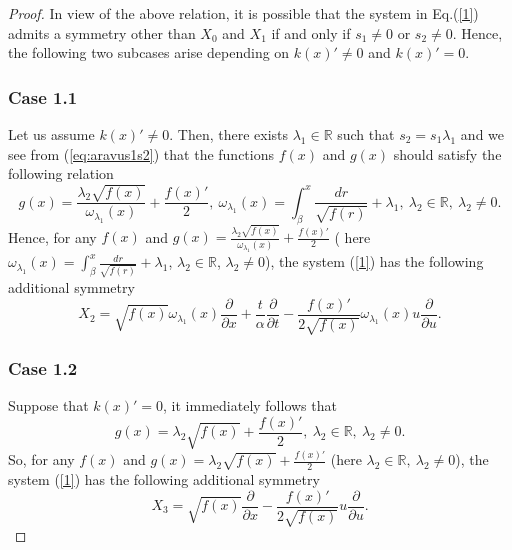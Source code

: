\documentclass[12pt]{amsart}
\begin{document}
\begin{proof}
In view of the above relation, it is possible that the system in Eq.(\ref{1}) admits a symmetry other than $X_0$ and $X_1$ if and only if $s_1\neq 0$ or $s_2\neq 0$. Hence, the following two subcases arise depending on $k(x)'\neq 0$ and $k(x)'=0$.

\subsubsection*{Case 1.1}
Let us assume $k(x)'\neq 0.$ Then, there exists $\lambda_1\in\mathbb{R}$ such that $s_2=s_1\lambda_1$ and we see from (\ref{eq:aravus1s2}) that the functions $f(x)$ and $g(x)$ should satisfy the following relation 
$$g(x)=\frac{\lambda_2 \sqrt{f(x)}}{\omega_{\lambda_1}(x)}+\frac{f(x)'}{2},~\omega_{\lambda_1}(x)=\int_\beta^x \frac{dr}{\sqrt{f(r)}} +\lambda_1,~\lambda_2\in \mathbb{R},~ \lambda_2\ne 0.$$ 
Hence, for any $f(x)$ and $g(x)=\frac{\lambda_2 \sqrt{f(x)}}{\omega_{\lambda_1}(x)}+\frac{f(x)'}{2}$ ( here $\omega_{\lambda_1}(x)=\int_\beta^x \frac{dr}{\sqrt{f(r)}} +\lambda_1$, $\lambda_2\in \mathbb{R}$, $\lambda_2\ne 0$),  the system (\ref{1}) has the following additional symmetry
\begin{equation*}
X_2 = \sqrt{f(x)}\omega_{\lambda_1}(x)\frac{\partial}{\partial x}
+\frac{t}{\alpha}\frac{\partial}{\partial t}-\frac{f(x)'}{2\sqrt{f(x)}}\omega_{\lambda_1}(x)u \frac{\partial}{\partial u}.
\end{equation*}

\subsubsection*{Case 1.2}
Suppose that $k(x)'=0$, it immediately follows that
$$g(x)=\lambda_2 \sqrt{f(x)}+\frac{f(x)'}{2}, ~\lambda_2\in \mathbb{R},~ \lambda_2\ne 0.$$
So, for any $f(x)$ and $g(x)=\lambda_2 \sqrt{f(x)}+\frac{f(x)'}{2}$ (here $\lambda_2\in \mathbb{R},~ \lambda_2\ne 0$), the system (\ref{1}) has the following additional symmetry
\begin{equation*}
X_3=\sqrt{f(x)}\frac{\partial}{\partial x}-\frac{f(x)'}{2\sqrt{f(x)}}u\frac{\partial}{\partial u}.
\end{equation*}


\end{proof}
\end{document}
